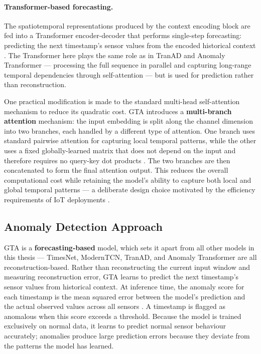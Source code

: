 \documentclass[twoside,11pt,openright]{report}
\begin{document}
\paragraph{Transformer-based forecasting.}
The spatiotemporal representations produced by the context encoding block are
fed into a Transformer encoder-decoder that performs single-step forecasting:
predicting the next timestamp's sensor values from the encoded historical
context \citep{gta2022}. The Transformer here plays the same role as in TranAD
and Anomaly Transformer --- processing the full sequence in parallel and
capturing long-range temporal dependencies through self-attention --- but is
used for prediction rather than reconstruction.

One practical modification is made to the standard multi-head self-attention
mechanism to reduce its quadratic cost. GTA introduces a \textbf{multi-branch
attention} mechanism: the input embedding is split along the channel dimension
into two branches, each handled by a different type of attention. One branch
uses standard pairwise attention for capturing local temporal patterns, while
the other uses a fixed globally-learned matrix that does not depend on the
input and therefore requires no query-key dot products \citep{gta2022}. The
two branches are then concatenated to form the final attention output. This
reduces the overall computational cost while retaining the model's ability to
capture both local and global temporal patterns --- a deliberate design choice
motivated by the efficiency requirements of IoT deployments \citep{gta2022}.

\subsection{Anomaly Detection Approach}

GTA is a \textbf{forecasting-based} model, which sets it apart from all other
models in this thesis --- TimesNet, ModernTCN, TranAD, and Anomaly Transformer
are all reconstruction-based. Rather than reconstructing the current input window
and measuring reconstruction error, GTA learns to predict the next timestamp's
sensor values from historical context. At inference time, the anomaly score for
each timestamp is the mean squared error between the model's prediction and the
actual observed values across all sensors \citep{gta2022}. A timestamp is flagged
as anomalous when this score exceeds a threshold. Because the model is trained
exclusively on normal data, it learns to predict normal sensor behaviour
accurately; anomalies produce large prediction errors because they deviate from
the patterns the model has learned.
\end{document}
